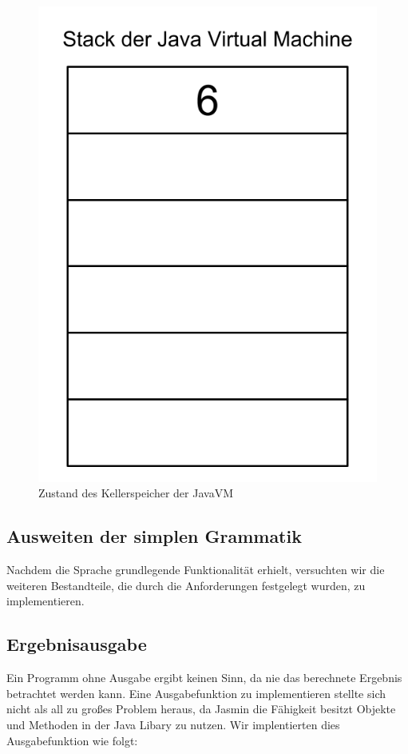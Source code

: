 \documentclass[12pt, a4paper, oneside, ngerman]{article}
\begin{document}
\begin{figure}[h!]
\centering
\includegraphics[scale=0.2]{stack_visual(3).png}
\caption{Zustand des Kellerspeicher der JavaVM}
\label{fig:method}
\end{figure}



\pagebreak

\subsection{Ausweiten der simplen Grammatik}
Nachdem die Sprache grundlegende Funktionalität erhielt, versuchten wir die weiteren Bestandteile, die durch die Anforderungen festgelegt wurden, zu implementieren. 


\subsection*{Ergebnisausgabe}
Ein Programm ohne Ausgabe ergibt keinen Sinn, da nie das berechnete Ergebnis betrachtet werden kann. Eine Ausgabefunktion zu implementieren stellte sich nicht als all zu großes Problem heraus, da Jasmin die Fähigkeit besitzt Objekte und Methoden in der Java Libary zu nutzen. Wir implentierten dies Ausgabefunktion wie folgt:
\end{document}
